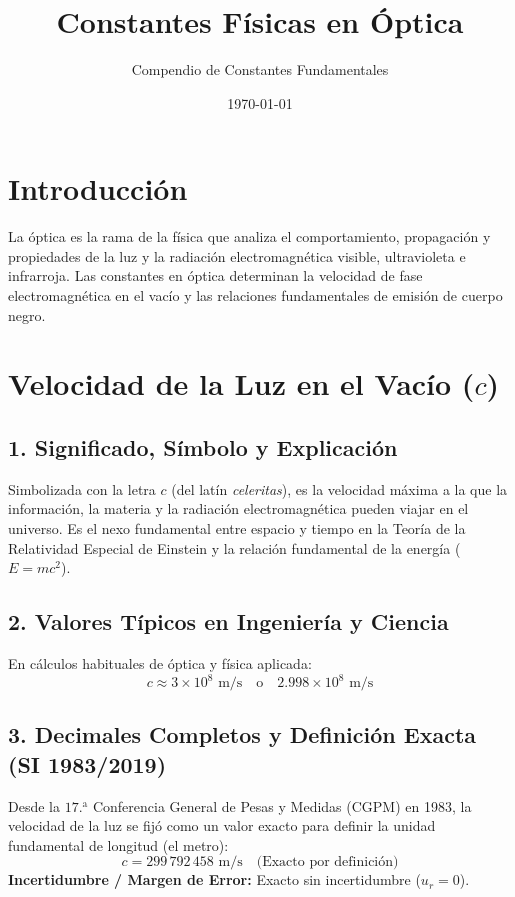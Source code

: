 \documentclass[12pt,a4paper]{article}
\title{\textbf{Constantes Físicas en Óptica}}
\author{Compendio de Constantes Fundamentales}
\date{\today}
\begin{document}
\maketitle

\section*{Introducción}
La óptica es la rama de la física que analiza el comportamiento, propagación y propiedades de la luz y la radiación electromagnética visible, ultravioleta e infrarroja. Las constantes en óptica determinan la velocidad de fase electromagnética en el vacío y las relaciones fundamentales de emisión de cuerpo negro.

\section{Velocidad de la Luz en el Vacío ($c$)}

\subsection*{1. Significado, Símbolo y Explicación}
Simbolizada con la letra $c$ (del latín \textit{celeritas}), es la velocidad máxima a la que la información, la materia y la radiación electromagnética pueden viajar en el universo. Es el nexo fundamental entre espacio y tiempo en la Teoría de la Relatividad Especial de Einstein y la relación fundamental de la energía ($E = mc^2$).

\subsection*{2. Valores Típicos en Ingeniería y Ciencia}
En cálculos habituales de óptica y física aplicada:
\begin{equation*}
c \approx 3 \times 10^8 \text{ m/s} \quad \text{o} \quad 2.998 \times 10^8 \text{ m/s}
\end{equation*}

\subsection*{3. Decimales Completos y Definición Exacta (SI 1983/2019)}
Desde la $17.^{\text{a}}$ Conferencia General de Pesas y Medidas (CGPM) en 1983, la velocidad de la luz se fijó como un valor exacto para definir la unidad fundamental de longitud (el metro):
\begin{equation*}
c = 299\,792\,458 \text{ m/s} \quad \text{(Exacto por definición)}
\end{equation*}
\textbf{Incertidumbre / Margen de Error:} Exacto sin incertidumbre ($u_r = 0$).
\end{document}
